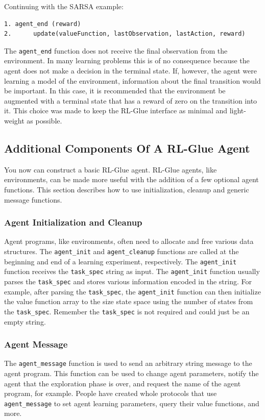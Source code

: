 \documentclass[11pt]{article}
\begin{document}
Continuing with the SARSA example:
\begin{verbatim}
1. agent_end (reward) 
2.      update(valueFunction, lastObservation, lastAction, reward)
\end{verbatim}


The \texttt{agent\_end} function does not receive the final observation from the environment. In many learning problems this is of no consequence because the agent does not make a decision in the terminal state. If, however, the agent were learning a model of the environment, information about the final transition would be important. In this case, it is recommended that the environment be augmented with a terminal state that has a reward of zero on the transition into it. This choice was made to keep the RL-Glue interface as minimal and light-weight as possible. 

\subsection{Additional Components Of A RL-Glue Agent}
\label{agentp2}
You now can construct a basic RL-Glue agent. RL-Glue agents, like environments, can be made more useful with the addition of a few optional agent functions. This section describes how to use initialization, cleanup and generic message functions.

\subsubsection{Agent Initialization and Cleanup}
Agent programs, like environments, often need to allocate and free various data structures. The \texttt{agent\_init}  and \texttt{agent\_cleanup} functions are called at the beginning and end of a learning experiment, respectively. The \texttt{agent\_init}  function receives the \texttt{task\_spec} string as input. The \texttt{agent\_init}  function usually parses the \texttt{task\_spec} and stores various information encoded in the string. For example, after parsing the \texttt{task\_spec}, the \texttt{agent\_init}  function can then initialize the value function array to the size state space using the number of states from the \texttt{task\_spec}. Remember the \texttt{task\_spec} is not required and could just be an empty string.      

\subsubsection{Agent Message}
The \texttt{agent\_message} function is used to send an arbitrary string message to the agent program. This function can be used to change agent parameters, notify the agent that the exploration phase is over, and request the name of the agent program, for example.  People have created whole protocols that use \texttt{agent\_message} to set agent learning parameters, query their value functions, and more.
\end{document}
